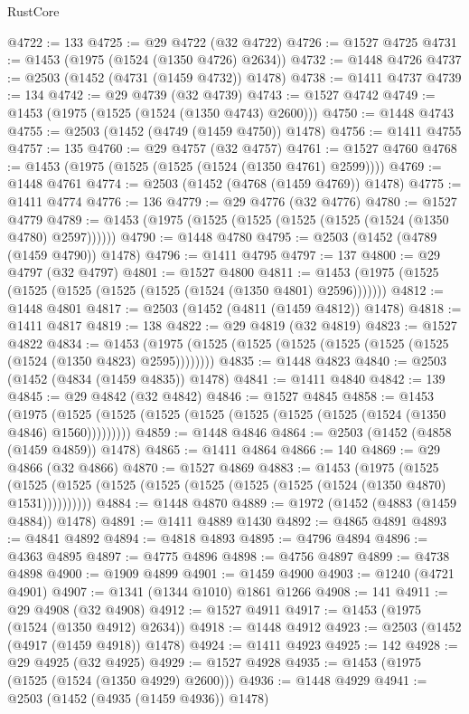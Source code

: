 \begin{lexlean}{RustCore}
\begin{coremodule}
{\begin{coremodule}
{{{{{{{{{{{{{{{{{{{{{{{{{{{{{{{{{{{{{{{{{{{{{@4722 := 133
@4725 := @29 @4722 (@32 @4722)
@4726 := @1527 @4725
@4731 := @1453 (@1975 (@1524 (@1350 @4726) @2634))
@4732 := @1448 @4726
@4737 := @2503 (@1452 (@4731 (@1459 @4732)) @1478)
@4738 := @1411 @4737
@4739 := 134
@4742 := @29 @4739 (@32 @4739)
@4743 := @1527 @4742
@4749 := @1453 (@1975 (@1525 (@1524 (@1350 @4743) @2600)))
@4750 := @1448 @4743
@4755 := @2503 (@1452 (@4749 (@1459 @4750)) @1478)
@4756 := @1411 @4755
@4757 := 135
@4760 := @29 @4757 (@32 @4757)
@4761 := @1527 @4760
@4768 := @1453 (@1975 (@1525 (@1525 (@1524 (@1350 @4761) @2599))))
@4769 := @1448 @4761
@4774 := @2503 (@1452 (@4768 (@1459 @4769)) @1478)
@4775 := @1411 @4774
@4776 := 136
@4779 := @29 @4776 (@32 @4776)
@4780 := @1527 @4779
@4789 := @1453 (@1975 (@1525 (@1525 (@1525 (@1525 (@1524 (@1350 @4780) @2597))))))
@4790 := @1448 @4780
@4795 := @2503 (@1452 (@4789 (@1459 @4790)) @1478)
@4796 := @1411 @4795
@4797 := 137
@4800 := @29 @4797 (@32 @4797)
@4801 := @1527 @4800
@4811 := @1453 (@1975 (@1525 (@1525 (@1525 (@1525 (@1525 (@1524 (@1350 @4801) @2596)))))))
@4812 := @1448 @4801
@4817 := @2503 (@1452 (@4811 (@1459 @4812)) @1478)
@4818 := @1411 @4817
@4819 := 138
@4822 := @29 @4819 (@32 @4819)
@4823 := @1527 @4822
@4834 := @1453 (@1975 (@1525 (@1525 (@1525 (@1525 (@1525 (@1525 (@1524 (@1350 @4823) @2595))))))))
@4835 := @1448 @4823
@4840 := @2503 (@1452 (@4834 (@1459 @4835)) @1478)
@4841 := @1411 @4840
@4842 := 139
@4845 := @29 @4842 (@32 @4842)
@4846 := @1527 @4845
@4858 := @1453
    (@1975 (@1525 (@1525 (@1525 (@1525 (@1525 (@1525 (@1525 (@1524 (@1350 @4846) @1560)))))))))
@4859 := @1448 @4846
@4864 := @2503 (@1452 (@4858 (@1459 @4859)) @1478)
@4865 := @1411 @4864
@4866 := 140
@4869 := @29 @4866 (@32 @4866)
@4870 := @1527 @4869
@4883 := @1453
    (@1975
      (@1525 (@1525 (@1525 (@1525 (@1525 (@1525 (@1525 (@1525 (@1524 (@1350 @4870) @1531))))))))))
@4884 := @1448 @4870
@4889 := @1972 (@1452 (@4883 (@1459 @4884)) @1478)
@4891 := @1411 @4889 @1430
@4892 := @4865 @4891
@4893 := @4841 @4892
@4894 := @4818 @4893
@4895 := @4796 @4894
@4896 := @4363 @4895
@4897 := @4775 @4896
@4898 := @4756 @4897
@4899 := @4738 @4898
@4900 := @1909 @4899
@4901 := @1459 @4900
@4903 := @1240 (@4721 @4901)
@4907 := @1341 (@1344 @1010) @1861 @1266
@4908 := 141
@4911 := @29 @4908 (@32 @4908)
@4912 := @1527 @4911
@4917 := @1453 (@1975 (@1524 (@1350 @4912) @2634))
@4918 := @1448 @4912
@4923 := @2503 (@1452 (@4917 (@1459 @4918)) @1478)
@4924 := @1411 @4923
@4925 := 142
@4928 := @29 @4925 (@32 @4925)
@4929 := @1527 @4928
@4935 := @1453 (@1975 (@1525 (@1524 (@1350 @4929) @2600)))
@4936 := @1448 @4929
@4941 := @2503 (@1452 (@4935 (@1459 @4936)) @1478)
}}}}}}}}}}}}}}}}}}}}}}}}}}}}}}}}}}}}}}}}}}}}}
\end{coremodule}}
\end{coremodule}
\end{lexlean}

